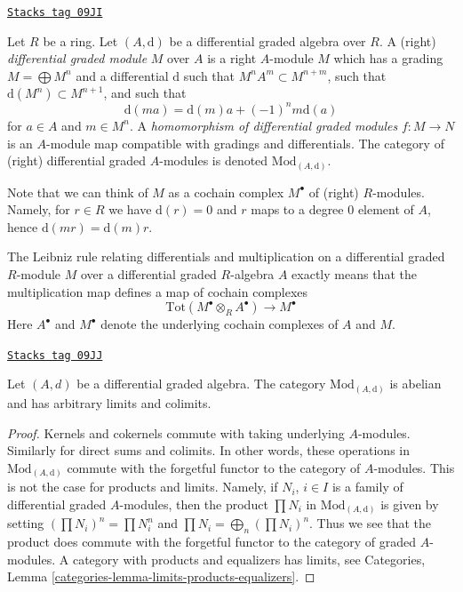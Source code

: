 \begin{definition}[Dgm]
\label{dga-definition-dgm}
\href{https://stacks.math.columbia.edu/tag/09JI}{\texttt{Stacks tag 09JI}}

Let $R$ be a ring.
Let $(A, \text{d})$ be a differential graded algebra over $R$.
A (right) {\it differential graded module} $M$ over $A$ is a right $A$-module
$M$ which has a grading $M = \bigoplus M^n$ and a differential $\text{d}$
such that $M^n A^m \subset M^{n + m}$, such that
$\text{d}(M^n) \subset M^{n + 1}$, and such that
$$
\text{d}(ma) = \text{d}(m)a + (-1)^n m\text{d}(a)
$$
for $a \in A$ and $m \in M^n$. A
{\it homomorphism of differential graded modules} $f : M \to N$
is an $A$-module map compatible with gradings and differentials.
The category of (right) differential graded $A$-modules is denoted
$\text{Mod}_{(A, \text{d})}$.
\end{definition}

Note that we can think of $M$ as a cochain complex $M^\bullet$
of (right) $R$-modules. Namely, for $r \in R$ we have $\text{d}(r) = 0$
and $r$ maps to a degree $0$ element of $A$, hence
$\text{d}(mr) = \text{d}(m)r$.

\medskip\noindent
The Leibniz rule relating differentials and multiplication on a differential
graded $R$-module $M$ over a differential graded $R$-algebra $A$
exactly means that the multiplication map defines a map of cochain complexes
$$
\text{Tot}(M^\bullet \otimes_R A^\bullet) \to M^\bullet
$$
Here $A^\bullet$ and $M^\bullet$ denote the underlying cochain complexes
of $A$ and $M$.

\begin{lemma}
\label{dga-lemma-dgm-abelian}
\href{https://stacks.math.columbia.edu/tag/09JJ}{\texttt{Stacks tag 09JJ}}

Let $(A, d)$ be a differential graded algebra. The category
$\text{Mod}_{(A, \text{d})}$ is abelian and has arbitrary limits and colimits.
\end{lemma}

\begin{proof}
Kernels and cokernels commute with taking underlying $A$-modules.
Similarly for direct sums and colimits. In other words, these operations
in $\text{Mod}_{(A, \text{d})}$ commute with the forgetful functor to the
category of $A$-modules. This is not the case for products and limits.
Namely, if $N_i$, $i \in I$ is a family of
differential graded $A$-modules, then the product $\prod N_i$ in
$\text{Mod}_{(A, \text{d})}$ is given by setting $(\prod N_i)^n = \prod N_i^n$
and $\prod N_i = \bigoplus_n (\prod N_i)^n$. Thus we see that the product
does commute with the forgetful functor to the category of graded $A$-modules.
A category with products and equalizers has limits, see
Categories, Lemma \ref{categories-lemma-limits-products-equalizers}.
\end{proof}


